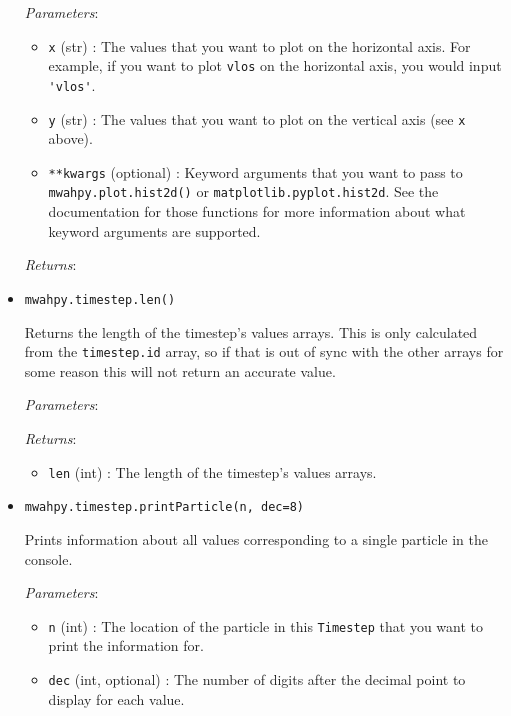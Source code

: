 \documentclass{article}
\begin{document}
\begin{itemize}
\textit{Parameters}: \begin{itemize}

\item \verb!x! (str) : The values that you want to plot on the horizontal axis. For example, if you want to plot \verb!vlos! on the horizontal axis, you would input \verb!'vlos'!.

\item \verb!y! (str) : The values that you want to plot on the vertical axis (see \verb!x! above).

\item \verb!**kwargs! (optional) : Keyword arguments that you want to pass to \verb!mwahpy.plot.hist2d()! or \verb!matplotlib.pyplot.hist2d!. See the documentation for those functions for more information about what keyword arguments are supported.

\end{itemize}

\textit{Returns}: 



\item \verb!mwahpy.timestep.len()!

Returns the length of the timestep's values arrays. This is only calculated from the \verb!timestep.id! array, so if that is out of sync with the other arrays for some reason this will not return an accurate value.

\textit{Parameters}: 

\textit{Returns}: \begin{itemize} 

\item \verb!len! (int) : The length of the timestep's values arrays.

\end{itemize}



\item \verb!mwahpy.timestep.printParticle(n, dec=8)!

Prints information about all values corresponding to a single particle in the console. 

\textit{Parameters}: \begin{itemize}

\item \verb!n! (int) : The location of the particle in this \verb!Timestep! that you want to print the information for. 

\item \verb!dec! (int, optional) : The number of digits after the decimal point to display for each value. 


\end{itemize}
\end{itemize}
\end{document}
